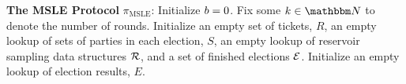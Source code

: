 \begin{mdframed}
	\textbf{The MSLE Protocol} $\pi_{\text{MSLE}}$:
	Initialize $b = 0$. Fix some $k \in \N$ to denote the number of rounds.
	Initialize an empty set of tickets, $R$, an empty lookup of sets of parties in each election, $S$,
	an empty lookup of reservoir sampling data structures $\mathcal{R}$,
	and a set of finished elections $\mathcal{E}$. Initialize an empty lookup of election results, $E$.

	\begin{itemize}




\end{itemize}
\end{mdframed}
